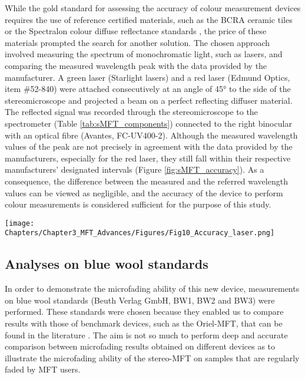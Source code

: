 While the gold standard for assessing the accuracy of colour measurement devices requires the use of reference certified materials, such as the BCRA ceramic tiles or the Spectralon colour diffuse reflectance standards \citep[128-34]{berns_billmeyer_2019}, the price of these materials prompted the search for another solution. The chosen approach involved measuring the spectrum of monochromatic light, such as lasers, and comparing the measured wavelength peak with the data provided by the manufacturer. A green laser (Starlight lasers) and a red laser (Edmund Optics, item \#52-840) were attached consecutively at an angle of \ang{45} to the side of the stereomicroscope and projected a beam on a perfect reflecting diffuser material. The reflected signal was recorded through the stereomicroscope to the spectrometer (Table \ref{tab:sMFT_components}) connected to the right binocular with an optical fibre (Avantes, FC-UV400-2). Although the measured wavelength values of the peak are not precisely in agreement with the data provided by the manufacturers, especially for the red laser, they still fall within their respective manufacturers’ designated intervals (Figure \ref{fig:sMFT_accuracy}). As a consequence, the difference between the measured and the referred wavelength values can be viewed as negligible, and the accuracy of the device to perform colour measurements is considered sufficient for the purpose of this study. 

\begin{figure*}
\centering
\texttt{[image: Chapters/Chapter3\_MFT\_Advances/Figures/Fig10\_Accuracy\_laser.png]}
\caption[\hspace{0.3cm}Spectral signal for the green and red lasers]{Spectral signal for the green and red lasers.}
\label{fig:sMFT_accuracy}
\end{figure*}



\subsection{Analyses on blue wool standards}
\label{sec:sMFT_BWS}


In order to demonstrate the microfading ability of this new device, measurements on blue wool standards (Beuth Verlag GmbH, BW1, BW2 and BW3) were performed. These standards were chosen because they enabled us to compare results with those of benchmark devices, such as the Oriel-MFT, that can be found in the literature \citep{tse_microfade_2018,ford_reality_2017, pesme_development_2016, morales-merino_micro-fading_2016}. The aim is not so much to perform deep and accurate comparison between microfading results obtained on different devices as to illustrate the microfading ability of the stereo-MFT on samples that are regularly faded by \gls{MFT} users.\\


